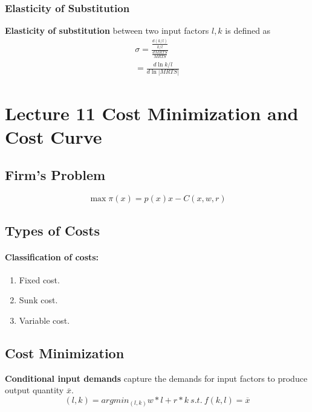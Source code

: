 \documentclass[]{article}
\begin{document}
       \subsubsection{Elasticity of Substitution}
            \begin{definition} \textbf{Elasticity of substitution} between two input factors $l, k$ is defined as
                \begin{gather*}
                    \sigma = \frac{\frac{d(k/l)}{k/l}}{\frac{dMRTS}{MRTS}} \\ = \frac{d\ln{k/l}}{d\ln{|MRTS|}}
                \end{gather*}
            \end{definition}
            
            
    \section{Lecture 11 Cost Minimization and Cost Curve}
        \subsection{Firm's Problem}
            \[
                \max \pi(x) = p(x) x - C(x, w, r)
            \]
        \subsection{Types of Costs}
            \paragraph{Classification of costs:}
            \begin{enumerate}
                \item Fixed cost.
                \item Sunk cost.
                \item Variable cost.
            \end{enumerate}
        
        \subsection{Cost Minimization}
            \begin{definition}
                \textbf{Conditional input demands} capture the demands for input factors to produce output quantity $\overline{x}$.
                \[
                    (l, k) = argmin_{(l, k)}{w*l + r*k}\ s.t.\ f(k, l) = \overline{x}
                \]
            \end{definition}
            
\end{document}
